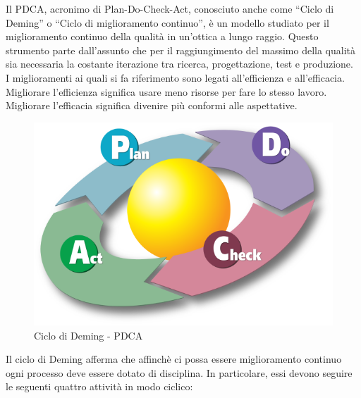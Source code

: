 
 \label{app:pdca}
Il PDCA, acronimo di Plan-Do-Check-Act, conosciuto anche come “Ciclo di Deming” o “Ciclo di miglioramento continuo”, è un modello studiato per il miglioramento continuo della qualità in un'ottica a lungo raggio. Questo strumento parte dall’assunto che per il raggiungimento del massimo della qualità sia necessaria la costante iterazione tra ricerca, progettazione, test e produzione.\\
I miglioramenti ai quali si fa riferimento sono legati all'efficienza e all'efficacia. Migliorare l'efficienza significa usare meno risorse per fare lo stesso lavoro. Migliorare l'efficacia significa divenire più conformi alle aspettative.\\
\begin{figure}[H]
	\centering
	\includegraphics[width=12cm]{PianoDiQualifica/Pics/PDCA_Cycle.png}
	\caption{Ciclo di Deming - PDCA}
\end{figure}
Il ciclo di Deming afferma che affinchè ci possa essere miglioramento continuo ogni processo deve essere dotato di disciplina. In particolare, essi devono seguire le seguenti quattro attività in modo ciclico:
